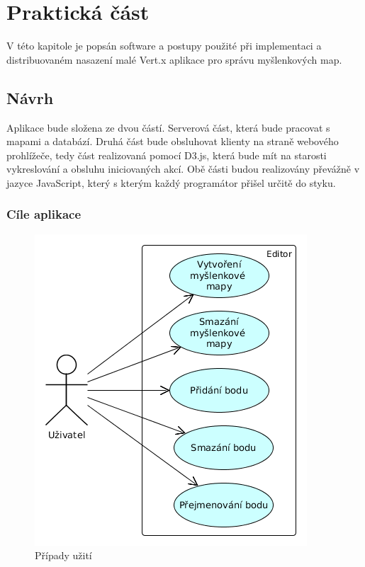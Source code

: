 
\chapter{Praktická část}

V této kapitole je popsán software a postupy použité při implementaci a distribuovaném nasazení malé Vert.x aplikace pro správu myšlenkových map.

\section{Návrh}

Aplikace bude složena ze dvou částí. Serverová část, která bude pracovat s mapami a databází. Druhá část bude obsluhovat klienty na straně webového prohlížeče, tedy část realizovaná pomocí D3.js, která bude mít na starosti vykreslování a obsluhu iniciovaných akcí.	Obě části budou realizovány převážně v jazyce JavaScript, který s kterým každý programátor přišel určitě do styku.

\subsection{Cíle aplikace}\label{sub:use_case}

\begin{figure}[h]
\begin{centering}
\includegraphics[scale=0.5]{obrazky/use_case}
\par\end{centering}
\caption{Případy užití\label{fig:use_case}}
\end{figure}


